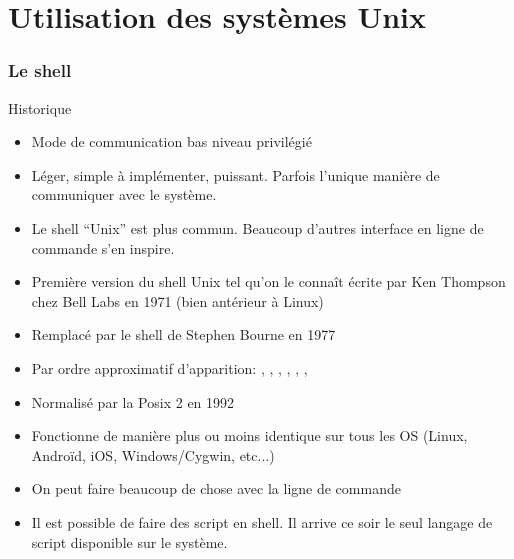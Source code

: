 %
%
%

\part{Utilisation des systèmes Unix}

\begin{frame}
  \partpage
\end{frame}

\begin{frame}
  \tableofcontents
\end{frame}

\section{Le shell}

\begin{frame}[fragile=singleslide]{Historique}
  \begin{itemize}
  \item Mode de communication bas niveau privilégié
  \item  Léger,  simple  à  implémenter, puissant.   Parfois  l'unique
    manière de communiquer avec le système.
  \item Le shell ``Unix'' est plus commun. Beaucoup d'autres interface
    en ligne de commande s'en inspire.
  \item Première version du shell Unix tel qu'on le connaît écrite par
    Ken Thompson chez Bell Labs en 1971 (bien antérieur à Linux)
  \item Remplacé par le shell de Stephen Bourne en 1977
  \item  Par  ordre  approximatif d'apparition:  ,  ,
    , , , , 
  \item Normalisé par la Posix 2 en 1992
  \item Fonctionne de manière plus  ou moins identique sur tous les OS
    (Linux, Androïd, iOS, Windows/Cygwin, etc...)
  \item On peut faire beaucoup de chose avec la ligne de commande
  \item Il  est possible de  faire des script  en shell. Il  arrive ce
    soir le seul langage de script disponible sur le système.
  \end{itemize}
\end{frame}

